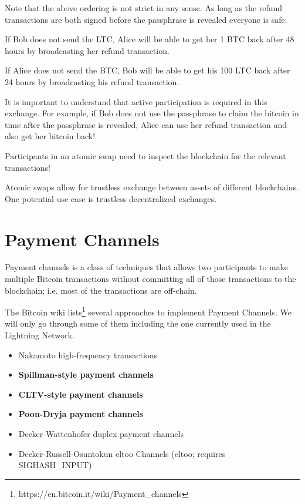 Note that the above ordering is not strict in any sense. As long as the refund transactions are both signed before the passphrase is revealed everyone is safe.

If Bob does not send the LTC, Alice will be able to get her 1 BTC back after 48 hours by broadcasting her refund transaction.

If Alice does not send the BTC, Bob will be able to get his 100 LTC back after 24 hours by broadcasting his refund transaction.

It is important to understand that active participation is required in this exchange. For example, if Bob does not use the passphrase to claim the bitcoin in time after the passphrase is revealed, Alice can use her refund transaction and also get her bitcoin back! 

\begin{note}
Participants in an atomic swap need to inspect the blockchain for the relevant transactions!
\end{note}

Atomic swaps allow for trustless exchange between assets of different blockchains. One potential use case is trustless decentralized exchanges. 




\section{Payment Channels}
\label{sec:payment-channels}
Payment channels is a class of techniques that allows two participants to make multiple Bitcoin transactions without committing all of those transactions to the blockchain; i.e. most of the transactions are off-chain.

The Bitcoin wiki lists\footnote{https://en.bitcoin.it/wiki/Payment\_channels} several approaches to implement Payment Channels. We will only go through some of them including the one currently used in the Lightning Network.

\begin{itemize}
\item Nakamoto high-frequency transactions
\item \textbf{Spillman-style payment channels}
\item \textbf{CLTV-style payment channels}
\item \textbf{Poon-Dryja payment channels}
\item Decker-Wattenhofer duplex payment channels
\item Decker-Russell-Osuntokun eltoo Channels (eltoo; requires SIGHASH\_INPUT)
\end{itemize}


